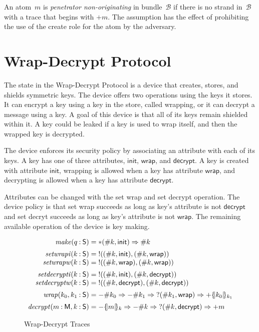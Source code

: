 \documentclass[12pt]{article}
\newcommand{\fn}[1]{\ensuremath{\operatorname{\mathit{#1}}}}
\newcommand{\srt}[1]{\ensuremath{\mathsf{#1}}}
\newcommand{\typ}{\mathbin:}
\newcommand{\enc}[2]{\ensuremath{\{\!|#1|\!\}_{#2}}}
\newcommand{\inbnd}{\mathord -}
\newcommand{\outbnd}{\mathord +}
\newcommand{\start}{\mathord\ast}
\newcommand{\sync}{\mathord !}
\newcommand{\obsv}{\mathord ?}
\newcommand{\bun}{\ensuremath{\mathcal{B}}}
\newcommand{\ainit}{\ensuremath{\mathsf{init}}}
\newcommand{\awrap}{\ensuremath{\mathsf{wrap}}}
\newcommand{\adecrypt}{\ensuremath{\mathsf{decrypt}}}
\begin{document}
An atom~$m$ is \emph{penetrator non-originating} in bundle~{\bun} if
there is no strand in~{\bun} with a trace that begins with $\outbnd
m$.  The assumption has the effect of prohibiting the use of the
create role for the atom by the adversary.

\section{Wrap-Decrypt Protocol}

The state in the Wrap-Decrypt Protocol is a device that creates,
stores, and shields symmetric keys.  The device offers two operations
using the keys it stores.  It can encrypt a key using a key in the
store, called wrapping, or it can decrypt a message using a key.  A
goal of this device is that all of its keys remain shielded within it.
A key could be leaked if a key is used to wrap itself, and then the
wrapped key is decrypted.

The device enforces its security policy by associating an attribute
with each of its keys.  A key has one of three attributes, \ainit,
\awrap, and \adecrypt.  A key is created with attribute \ainit,
wrapping is allowed when a key has attribute \awrap, and decrypting is
allowed when a key has attribute \adecrypt. 

Attributes can be changed with the set wrap and set decrypt operation.
The device policy is that set wrap succeeds as long as key's attribute
is not {\adecrypt} and set decryt succeeds as long as key's attribute
is not \awrap.  The remaining available operation of the device is
key making.

\begin{figure}
  \[
  \begin{array}{r@{}l}
    \fn{make}(q\typ\srt{S})={}&\start(\#k, \ainit)\Rightarrow\#k\\[1.2ex]
    \fn{setwrapi}(k\typ\srt{S})={}&\sync((\#k,\ainit),(\#k,\awrap))\\
    \fn{setwrapw}(k\typ\srt{S})={}&\sync((\#k,\awrap),(\#k,\awrap))\\[1.2ex]
    \fn{setdecrypti}(k\typ\srt{S})={}&\sync((\#k,\ainit),(\#k,\adecrypt))\\
    \fn{setdecryptw}(k\typ\srt{S})={}&\sync
    ((\#k,\adecrypt),(\#k,\adecrypt))\\[1.2ex]
    \fn{wrap}(k_0,k_1\typ\srt{S})={}&
    \inbnd\#k_0\Rightarrow\inbnd\#k_1\Rightarrow
    \obsv(\#k_1,\awrap)\Rightarrow\outbnd\enc{k_0}{k_1}\\[1.2ex]
    \fn{decrypt}(m\typ\srt{M},k\typ\srt{S})={}&
    \inbnd\enc{m}{k}\Rightarrow\inbnd\#k\Rightarrow
    \obsv(\#k,\adecrypt)\Rightarrow\outbnd m
  \end{array}
  \]
  \caption{Wrap-Decrypt Traces}\label{fig:wrap-decrypt traces}
\end{figure}
\end{document}
